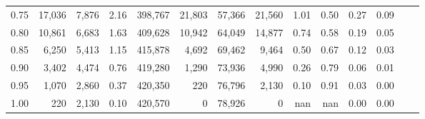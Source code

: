 \begin{tabular}{rrrrrrrrrrrrrr}
0.75 &  17,036 &  7,876 &     2.16 &  398,767 &   21,803 &  57,366 &  21,560 &  1.01 &  0.50 &  0.27 &      0.09 \\
0.80 &  10,861 &  6,683 &     1.63 &  409,628 &   10,942 &  64,049 &  14,877 &  0.74 &  0.58 &  0.19 &      0.05 \\
0.85 &   6,250 &  5,413 &     1.15 &  415,878 &    4,692 &  69,462 &   9,464 &  0.50 &  0.67 &  0.12 &      0.03 \\
0.90 &   3,402 &  4,474 &     0.76 &  419,280 &    1,290 &  73,936 &   4,990 &  0.26 &  0.79 &  0.06 &      0.01 \\
0.95 &   1,070 &  2,860 &     0.37 &  420,350 &      220 &  76,796 &   2,130 &  0.10 &  0.91 &  0.03 &      0.00 \\
1.00 &     220 &  2,130 &     0.10 &  420,570 &        0 &  78,926 &       0 &   nan &   nan &  0.00 &      0.00 \\
\bottomrule
\end{tabular}
